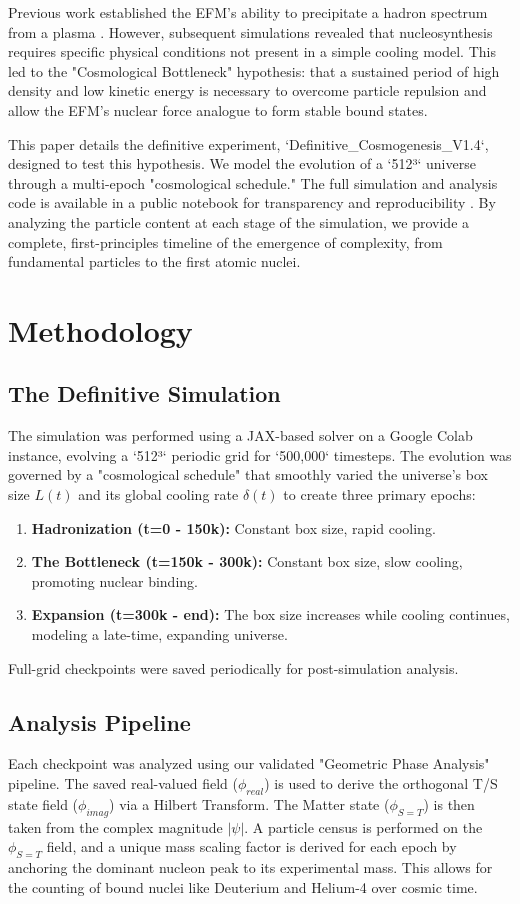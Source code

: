 \documentclass[11pt]{article}
\begin{document}
Previous work established the EFM's ability to precipitate a hadron spectrum from a plasma \citep{emvula2025hadron_spectrum}. However, subsequent simulations revealed that nucleosynthesis requires specific physical conditions not present in a simple cooling model. This led to the "Cosmological Bottleneck" hypothesis: that a sustained period of high density and low kinetic energy is necessary to overcome particle repulsion and allow the EFM's nuclear force analogue to form stable bound states.

This paper details the definitive experiment, `Definitive_Cosmogenesis_V1.4`, designed to test this hypothesis. We model the evolution of a `512³` universe through a multi-epoch "cosmological schedule." The full simulation and analysis code is available in a public notebook for transparency and reproducibility \citep{atomsform_notebook_definitive}. By analyzing the particle content at each stage of the simulation, we provide a complete, first-principles timeline of the emergence of complexity, from fundamental particles to the first atomic nuclei.

\section{Methodology}
\subsection{The Definitive Simulation}
The simulation was performed using a JAX-based solver on a Google Colab instance, evolving a `512³` periodic grid for `500,000` timesteps. The evolution was governed by a "cosmological schedule" that smoothly varied the universe's box size \(L(t)\) and its global cooling rate \(\delta(t)\) to create three primary epochs:
\begin{enumerate}
    \item \textbf{Hadronization (t=0 - 150k):} Constant box size, rapid cooling.
    \item \textbf{The Bottleneck (t=150k - 300k):} Constant box size, slow cooling, promoting nuclear binding.
    \item \textbf{Expansion (t=300k - end):} The box size increases while cooling continues, modeling a late-time, expanding universe.
\end{enumerate}
Full-grid checkpoints were saved periodically for post-simulation analysis.

\subsection{Analysis Pipeline}
Each checkpoint was analyzed using our validated "Geometric Phase Analysis" pipeline. The saved real-valued field (\(\phi_{real}\)) is used to derive the orthogonal T/S state field (\(\phi_{imag}\)) via a Hilbert Transform. The Matter state (\(\phi_{S=T}\)) is then taken from the complex magnitude \(|\psi|\). A particle census is performed on the \(\phi_{S=T}\) field, and a unique mass scaling factor is derived for each epoch by anchoring the dominant nucleon peak to its experimental mass. This allows for the counting of bound nuclei like Deuterium and Helium-4 over cosmic time.
\end{document}
